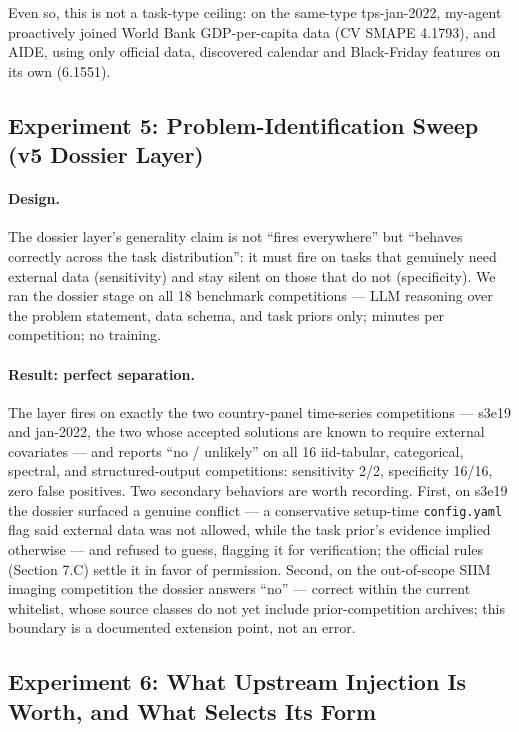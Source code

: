 \documentclass[11pt,a4paper]{article}
\begin{document}
Even so, this is not a task-type ceiling: on the same-type tps-jan-2022, my-agent proactively joined World Bank GDP-per-capita data (CV SMAPE 4.1793), and AIDE, using only official data, discovered calendar and Black-Friday features on its own (6.1551).

\subsection{Experiment 5: Problem-Identification Sweep (v5 Dossier Layer)}
\label{sec:exp5v5}

\paragraph{Design.} The dossier layer's generality claim is not ``fires everywhere'' but ``behaves correctly across the task distribution'': it must fire on tasks that genuinely need external data (sensitivity) and stay silent on those that do not (specificity). We ran the dossier stage on all 18 benchmark competitions --- LLM reasoning over the problem statement, data schema, and task priors only; minutes per competition; no training.

\paragraph{Result: perfect separation.} The layer fires on exactly the two country-panel time-series competitions --- s3e19 and jan-2022, the two whose accepted solutions are known to require external covariates --- and reports ``no / unlikely'' on all 16 iid-tabular, categorical, spectral, and structured-output competitions: sensitivity 2/2, specificity 16/16, zero false positives. Two secondary behaviors are worth recording. First, on s3e19 the dossier surfaced a genuine conflict --- a conservative setup-time \texttt{config.yaml} flag said external data was not allowed, while the task prior's evidence implied otherwise --- and refused to guess, flagging it for verification; the official rules (Section 7.C) settle it in favor of permission. Second, on the out-of-scope SIIM imaging competition the dossier answers ``no'' --- correct within the current whitelist, whose source classes do not yet include prior-competition archives; this boundary is a documented extension point, not an error.

\subsection{Experiment 6: What Upstream Injection Is Worth, and What Selects Its Form}
\label{sec:exp6v5}
\end{document}
